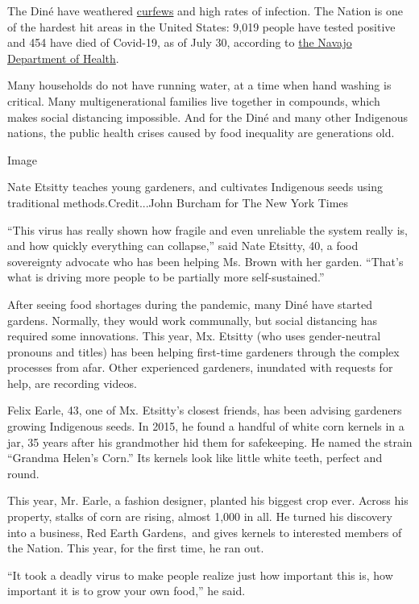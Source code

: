 The Diné have weathered
\href{https://www.reuters.com/article/us-health-coronavirus-usa-navajo/facing-arizona-surge-navajos-reimpose-virus-curfew-idUSKBN23O3R4}{curfews}
and high rates of infection. The Nation is one of the hardest hit areas
in the United States: 9,019 people have tested positive and 454 have
died of Covid-19, as of July 30, according to
\href{https://www.ndoh.navajo-nsn.gov/COVID-19}{the Navajo Department of
Health}.

Many households do not have running water, at a time when hand washing
is critical. Many multigenerational families live together in compounds,
which makes social distancing impossible. And for the Diné and many
other Indigenous nations, the public health crises caused by food
inequality are generations old.

Image

Nate Etsitty teaches young gardeners, and cultivates Indigenous seeds
using traditional methods.Credit...John Burcham for The New York Times

``This virus has really shown how fragile and even unreliable the system
really is, and how quickly everything can collapse,'' said Nate Etsitty,
40, a food sovereignty advocate who has been helping Ms. Brown with her
garden. ``That's what is driving more people to be partially more
self-sustained.''

After seeing food shortages during the pandemic, many Diné have started
gardens. Normally, they would work communally, but social distancing has
required some innovations. This year, Mx. Etsitty (who uses
gender-neutral pronouns and titles) has been helping first-time
gardeners through the complex processes from afar. Other experienced
gardeners, inundated with requests for help, are recording videos.

Felix Earle, 43, one of Mx. Etsitty's closest friends, has been advising
gardeners growing Indigenous seeds. In 2015, he found a handful of white
corn kernels in a jar, 35 years after his grandmother hid them for
safekeeping. He named the strain ``Grandma Helen's Corn.'' Its kernels
look like little white teeth, perfect and round.

This year, Mr. Earle, a fashion designer, planted his biggest crop ever.
Across his property, stalks of corn are rising, almost 1,000 in all. He
turned his discovery into a business, Red Earth Gardens,~and gives
kernels to interested members of the Nation. This year, for the first
time, he ran out.

``It took a deadly virus to make people realize just how important this
is, how important it is to grow your own food,'' he said.

